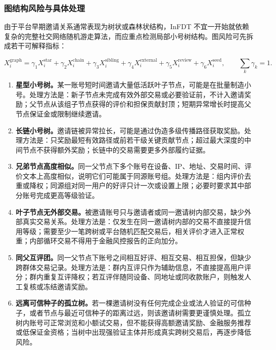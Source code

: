 \documentclass[UTF8,11pt]{ctexart}
\begin{document}
\subsubsection*{图结构风险与具体处理}

由于平台早期邀请关系通常表现为树状或森林状结构，InFDT 不宜一开始就依赖复杂的完整社交网络随机游走算法，而应重点检测局部小号树结构。图风险可先拆成若干可解释指标：

\[
    X_i^{\mathrm{graph}}
    =
    \gamma_1X_i^{\mathrm{star}}
    +
    \gamma_2X_i^{\mathrm{chain}}
    +
    \gamma_3X_i^{\mathrm{sibling}}
    +
    \gamma_4X_i^{\mathrm{external}}
    +
    \gamma_5X_i^{\mathrm{review}}
    +
    \gamma_6X_i^{\mathrm{seed}},
    \qquad \sum_k\gamma_k=1.
\]

\begin{enumerate}[label=\arabic*.]
    \item \textbf{星型小号树。}某一账号短时间邀请大量低活跃叶子节点，可能是在批量制造小号。处理方法是：新子节点未完成有效外部交易或必要验证前，不计入邀请奖励；父节点从该组子节点获得的评价和担保贡献封顶；短期异常增长时提高父节点保证金或限制继续邀请。

    \item \textbf{长链小号树。}邀请链被异常拉长，可能是通过伪造多级传播路径获取奖励。处理方法是：只奖励最短有效路径或前若干级关键贡献节点；超过最大深度的中间节点不获得额外奖励；长链中的交易需要更多外部履约证据。

    \item \textbf{兄弟节点高度相似。}同一父节点下多个账号在设备、IP、地址、交易时间、评价文本上高度相似，说明它们可能属于同源账号组。处理方法是：组内评价去重或降权；同源组对同一用户的好评只计一次或设置上限；必要时要求其中部分账号完成更高等级验证。

    \item \textbf{叶子节点无外部交易。}被邀请账号只与邀请者或同一邀请树内部交易，缺少外部真实交易关系。处理方法是：仅发生在同一邀请树内部的交易不直接提升信用等级；需要至少一笔跨树或平台随机匹配交易后，相关评价才进入正常权重；内部循环交易不得用于金融风控报告的正向加分。

    \item \textbf{同父互评团。}同一父节点下账号之间相互好评、相互交易、相互担保，但缺少跨群体交易记录。处理方法是：群内互评只作为辅助信息，不直接提高用户评分；群内重复互评降权；若互评伴随同设备、同地址或同收款账户，则触发人工复核或冻结邀请奖励。

    \item \textbf{远离可信种子的孤立树。}若一棵邀请树没有任何完成企业或法人验证的可信种子，或者节点与最近可信种子的距离过远，则该邀请树需要更谨慎处理。孤立树内账号可正常浏览和小额试交易，但不能获得高额邀请奖励、金融服务推荐或低保证金资格；当树中出现强验证主体并形成真实跨树交易后，再逐步降低风险。
\end{enumerate}
\end{document}
